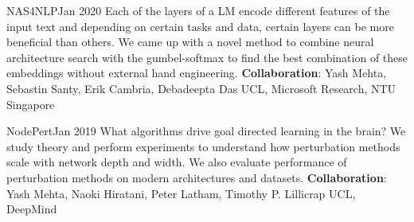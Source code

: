 
%
%
%


\begin{projects}
	\project
	{NAS4NLP}{Jan 2020}
	{Each of the layers of a LM encode different features of the input text and depending on certain tasks and data, certain layers can be more beneficial than others. We came up with a novel method to combine neural architecture search with the gumbel-softmax to find the best combination of these embeddings without external hand engineering.}
	{\textbf{Collaboration}: Yash Mehta, Sebastin Santy, Erik Cambria, Debadeepta Das}
	{UCL, Microsoft Research, NTU Singapore}
				
	\project
	{NodePert}{Jan 2019}
	{What algorithms drive goal directed learning in the brain? 
	We study theory and perform experiments to understand how perturbation methods scale with network depth and width. We also evaluate performance of perturbation methods on modern architectures and datasets.}
	{\textbf{Collaboration}: Yash Mehta, Naoki Hiratani, Peter Latham, Timothy P. Lillicrap}
	{UCL, DeepMind}

\end{projects}